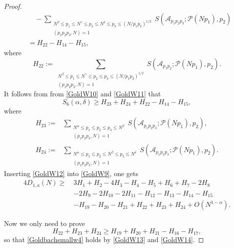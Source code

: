 \documentclass[12pt, a4paper]{amsart}
\def\leq{\leqslant}
\def\le{\leqslant}
\def\ge{\geqslant}
\theoremstyle{plain}
\theoremstyle{remark}
\numberwithin{equation}{section}
\begin{document}
\begin{proof}
\begin{equation}
\begin{split}
		&\quad - \sum_{\substack{N^\beta \le p_1\le N^\gamma \le p_2\le N^{\delta}\le p_3\le (N/p_1p_2)^{1/2} \\ (p_1 p_2 p_3, N) = 1}}  S(\mathscr{A}_{p_1 p_2 p_3}; \mathscr{P}(Np_1), p_2)\\
		&= H_{22}-H_{14}-H_{15}, 
\end{split}
\end{equation}
where
\begin{equation}
H_{22}:=\sum_{\substack{N^{\beta} \leq p_1 \le N^{\gamma} \leq p_2 \le p_3\le (N/p_1p_2)^{1/2} \\ (p_1 p_2 p_3, N) = 1}} S(\mathscr{A}_{p_1 p_2}; \mathscr{P}(N p_1), p_2). 
\end{equation}
It follows from from \eqref{GoldW10} and \eqref{GoldW11} that 
\begin{equation}\label{GoldW12}
			S_6(\alpha,\delta)\ge H_{23}+H_{24}+H_{22}-H_{14}-H_{15},
		\end{equation}
		where
		\begin{equation}
		\begin{split}
		H_{23}:=&\sum_{\substack{N^\alpha \le p_1 \le p_2 \le p_3\le N^\beta \\ (p_1 p_2 p_3, N) = 1}}  S(\mathscr{A}_{p_1 p_2 p_3}; \mathscr{P}(Np_1), p_2),\\
		H_{24}:=&\sum_{\substack{N^\alpha \le p_1 \le p_2\le N^\beta \le p_3\le N^{\delta} \\ (p_1 p_2 p_3, N) = 1}}  S(\mathscr{A}_{p_1 p_2 p_3}; \mathscr{P}(Np_1), p_2).
		\end{split}
		\end{equation}
Inserting \eqref{GoldW12} into \eqref{GoldW9}, one gets 
		\begin{equation}\label{GoldW13}
		\begin{split}
		4D_{1,a}(N)
		\ge\ 
		& 3H_1+H_2-4H_3-H_4-H_5+H_6+H_7-2H_8\\
		&-2H_9-2H_{10}-2H_{11}-H_{12}-H_{13}-H_{14}-H_{15}\\
		&-H_{19}-H_{20}-H_{21}+H_{22}+H_{23}+H_{24}+O(N^{1-\alpha}).
		\end{split}
		\end{equation}
		
Now we only need to prove  
\begin{equation}\label{GoldW14}
H_{22}+H_{23}+H_{24}\ge H_{19}+H_{20}+H_{21}-H_{16}-H_{17},
\end{equation}
so that \eqref{Goldbachsmallw4} holds by \eqref{GoldW13} and \eqref{GoldW14}.
		

\end{proof}
\end{document}

